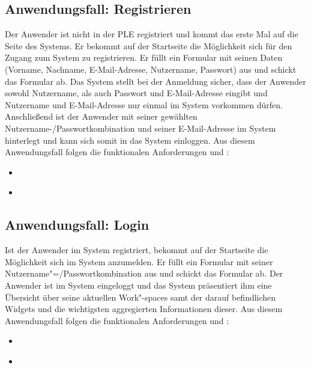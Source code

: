 \subsection{Anwendungsfall: Registrieren}
Der Anwender ist nicht in der PLE registriert und kommt das erste Mal auf die Seite des Systems. Er bekommt auf der Startseite die Möglichkeit sich für den Zugang zum System zu registrieren. Er füllt ein Formular mit seinen Daten (Vorname, Nachname, E-Mail-Adresse, Nutzername, Passwort) aus und schickt das Formular ab. Das System stellt bei der Anmeldung sicher, dass der Anwender sowohl Nutzername, als auch Passwort und E-Mail-Adresse eingibt und Nutzername und E-Mail-Adresse nur einmal im System vorkommen dürfen. Anschließend ist der Anwender mit seiner gewählten Nutzername-/Passwortkombination und seiner E-Mail-Adresse im System hinterlegt und kann sich somit in das System einloggen. Aus diesem Anwendungsfall folgen die funktionalen Anforderungen  und :\\
\begin{itemize}
 \item \requirementf{\requirementRegistrieren}\label{requirementRegistrieren}
 \item \requirementf{\requirementUniqueLoginEmail}\label{requirementUniqueLoginEmail}
\end{itemize}
 
\subsection{Anwendungsfall: Login}
Ist der Anwender im System registriert, bekommt auf der Startseite die Möglichkeit sich im System anzumelden. Er füllt ein Formular mit seiner Nutzername"=/Passwortkombination aus und schickt das Formular ab. Der Anwender ist im System eingeloggt und das System präsentiert ihm eine Übersicht über seine aktuellen Work"-spaces samt der darauf befindlichen Widgets und die wichtigsten aggregierten Informationen dieser. Aus diesem Anwendungsfall folgen die funktionalen Anforderungen  und :
\begin{itemize}
 \item \requirementf{\requirementLogin}\label{requirementLogin}
 \item \requirementf{\requirementZugriffAufEigeneWidgets}\label{requirementZugriffAufEigeneWidgets}
\end{itemize}

